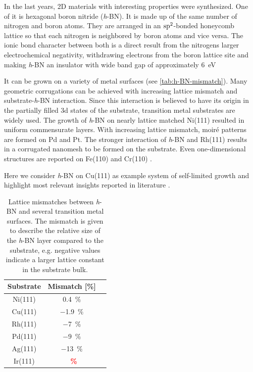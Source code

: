 In the last years, 2D materials with interesting properties were synthesized. One of it is hexagonal boron nitride (\textit{h}-BN). It is made up of the same number of nitrogen and boron atoms. They are arranged in an $\textnormal{sp}^2$-bonded honeycomb lattice so that each nitrogen is neighbored by boron atoms and vice versa. The ionic bond character between both is a direct result from the nitrogens larger electrochemical negativity, withdrawing electrons from the boron lattice site and making \textit{h}-BN an insulator with wide band gap of approximately \SI{6}{\eV} \cite{watanabe_direct-bandgap_2004, cassabois_hexagonal_2016, blase_quasiparticle_1995}

It can be grown on a variety of metal surfaces (see \autoref{tab:h-BN-mismatch}). Many geometric corrugations can be achieved with increasing lattice mismatch and substrate-\textit{h}-BN interaction. Since this interaction is believed to have its origin in the partially filled 3d states of the substrate, transition metal substrates are widely used. 
The growth of \textit{h}-BN on nearly lattice matched Ni(111) resulted in uniform commensurate layers. With increasing lattice mismatch, moir\'e patterns are formed on Pd and Pt. The stronger interaction of \textit{h}-BN and Rh(111) results in a corrugated nanomesh to be formed on the substrate. Even one-dimensional structures are reported on Fe(110) \cite{vinogradov_one-dimensional_2012} and Cr(110) \cite{10.1016/j.susc.2008.06.037}. 

Here we consider \textit{h}-BN on Cu(111) as example system of self-limited growth and highlight most relevant insights reported in literature \cite{joshi_boron_2012, schwarz_corrugation_2017, auwarter_hexagonal_2018}.

\begin{table}\centering
	\caption{Lattice mismatches between \textit{h}-BN and several transition metal surfaces. The mismatch is given to describe the relative size of the \textit{h}-BN layer compared to the substrate, e.g. negative values indicate a larger lattice constant in the substrate bulk.}
	
	\begin{tabular}{ccc}
		Substrate 	& Mismatch [\%] \\ \hline
		Ni(111)		& \SI{+0.4}{\percent} \\
		Cu(111)		& \SI{-1.9}{\percent} \\	
		Rh(111)		& \SI{-7}{\percent} \\	
		Pd(111)		& \SI{-9}{\percent} \\
		Ag(111)		& \SI{-13}{\percent} \\
		Ir(111)		& \textcolor{red}{\textbf{\SI{}{\percent}}} \\
	\end{tabular}
	\label{tab:h-BN-mismatch}
\end{table}

